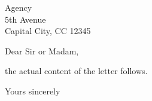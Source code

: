 \documentclass[fromalign=right,addrfield=true,
  foldmarks=true,parskip=full]{scrlttr2}
\date{\today}
\begin{document}
\begin{letter}{Agency \\ 5th Avenue \\ Capital City, CC 12345}
\opening{Dear Sir or Madam,}
the actual content of the letter follows.
\closing{Yours sincerely}
\end{letter} 
\end{document}
